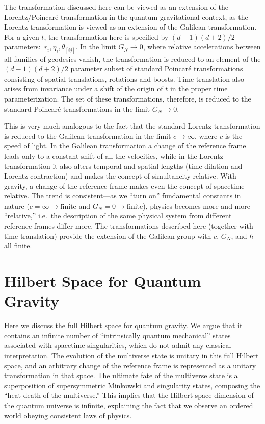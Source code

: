 \documentclass[12pt]{article}
\begin{document}
The transformation discussed here can be viewed as an extension of the 
Lorentz/Poincar\'{e} transformation in the quantum gravitational context, 
as the Lorentz transformation is viewed as an extension of the Galilean 
transformation.  For a given $t$, the transformation here is specified 
by $(d-1)(d+2)/2$ parameters:\ $r_i, \eta_i, \theta_{[ij]}$.  In the 
limit $G_N \rightarrow 0$, where relative accelerations between all 
families of geodesics vanish, the transformation is reduced to an 
element of the $(d-1)(d+2)/2$ parameter subset of standard Poincar\'{e} 
transformations consisting of spatial translations, rotations and 
boosts.  Time translation also arises from invariance under a shift 
of the origin of $t$ in the proper time parameterization.  The set 
of these transformations, therefore, is reduced to the standard 
Poincar\'{e} transformations in the limit $G_N \rightarrow 0$.

This is very much analogous to the fact that the standard Lorentz 
transformation is reduced to the Galilean transformation in the limit 
$c \rightarrow \infty$, where $c$ is the speed of light.  In the Galilean 
transformation a change of the reference frame leads only to a constant 
shift of all the velocities, while in the Lorentz transformation it 
also alters temporal and spatial lengths (time dilation and Lorentz 
contraction) and makes the concept of simultaneity relative.  With 
gravity, a change of the reference frame makes even the concept of 
spacetime relative.  The trend is consistent---as we ``turn on'' 
fundamental constants in nature ($c = \infty \rightarrow \mbox{finite}$ 
and $G_N = 0 \rightarrow \mbox{finite}$), physics becomes more and more 
``relative,'' i.e.\ the description of the same physical system from 
different reference frames differ more.  The transformations described 
here (together with time translation) provide the extension of the 
Galilean group with $c$, $G_N$, and $\hbar$ all finite.


\section{Hilbert Space for Quantum Gravity}
\label{sec:Hilbert-QG}

Here we discuss the full Hilbert space for quantum gravity.  We argue 
that it contains an infinite number of ``intrinsically quantum mechanical'' 
states associated with spacetime singularities, which do not admit any 
classical interpretation.  The evolution of the multiverse state is 
unitary in this full Hilbert space, and an arbitrary change of the 
reference frame is represented as a unitary transformation in that 
space.  The ultimate fate of the multiverse state is a superposition 
of supersymmetric Minkowski and singularity states, composing the ``heat 
death of the multiverse.''  This implies that the Hilbert space dimension 
of the quantum universe is infinite, explaining the fact that we observe 
an ordered world obeying consistent laws of physics.
\end{document}
